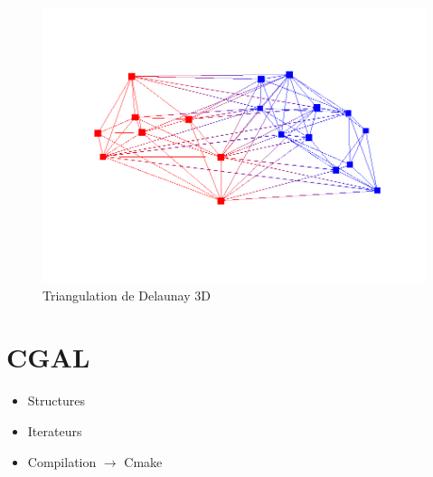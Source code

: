 \begin{figure}[ht]
  \includegraphics[width=\textwidth]{figures/3d_triangulation.png}
  \caption{Triangulation de Delaunay 3D }
  \label{fig::delaunay_3d}
\end{figure}

\section{CGAL}
\begin{itemize}
  \item Structures
  \item Iterateurs
  \item Compilation $\to$ Cmake
\end{itemize}
